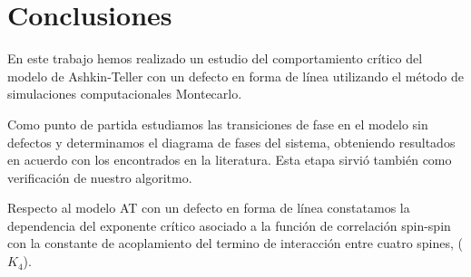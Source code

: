 \section{Conclusiones}

En este trabajo hemos realizado un estudio del comportamiento crítico del modelo
 de Ashkin-Teller con un defecto en forma de línea utilizando el método de
 simulaciones computacionales Montecarlo.
 
Como punto de partida estudiamos las transiciones de fase en el modelo sin
 defectos y determinamos el diagrama de fases del sistema, obteniendo resultados
 en acuerdo con los encontrados en la literatura. Esta etapa sirvió también como
 verificación de nuestro algoritmo.

Respecto al modelo AT con un defecto en forma de línea constatamos la dependencia
 del exponente crítico asociado a la función de correlación spin-spin con la
 constante de acoplamiento del termino de interacción entre cuatro spines, ($K_{4}$).

